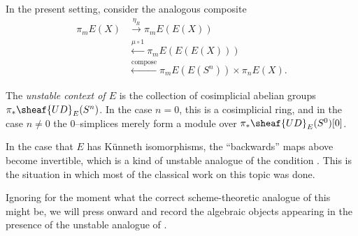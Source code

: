 In the present setting, consider the analogous composite
\begin{align*}
\pi_m E(X) & \xrightarrow{\eta_R} \pi_m E(E(X)) \\
& \xleftarrow{\mu \circ 1} \pi_m E(E(E(X))) \\
& \xleftarrow{\mathrm{compose}} \pi_m E(E(S^n)) \times \pi_n E(X).
\end{align*}

\begin{definition}
The \textit{unstable context of $E$} is the collection of cosimplicial abelian groups $\pi_* \sheaf{UD}_E(S^n)$.  In the case $n = 0$, this is a cosimplicial ring, and in the case $n \ne 0$ the $0$--simplices merely form a module over $\pi_* \sheaf{UD}_E(S^0)[0]$.
\end{definition}

\begin{remark}
In the case that $E$ has K\"unneth isomorphisms, the ``backwards'' maps above become invertible, which is a kind of unstable analogue of the condition {\FH}.  This is the situation in which most of the classical work on this topic was done.
\end{remark}


Ignoring for the moment what the correct scheme-theoretic analogue of this might be, we will press onward and record the algebraic objects appearing in the presence of the unstable analogue of {\FH}.

